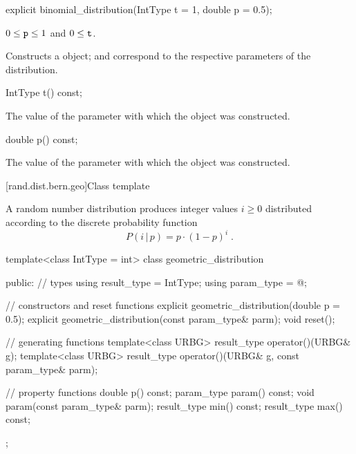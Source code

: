 %
\begin{itemdecl}
explicit binomial_distribution(IntType t = 1, double p = 0.5);
\end{itemdecl}

\begin{itemdescr}
\pnum\requires
 $0 \leq \texttt{\protect p} \leq 1$ and $0 \leq \texttt{\protect t} $.

\pnum\effects Constructs a  object;
  and 
 correspond to the respective parameters of the distribution.
\end{itemdescr}

%
\begin{itemdecl}
IntType t() const;
\end{itemdecl}%
\begin{itemdescr}
\pnum\returns The value of the  parameter
 with which the object was constructed.
\end{itemdescr}

%
\begin{itemdecl}
double p() const;
\end{itemdecl}

\begin{itemdescr}
\pnum\returns The value of the  parameter
 with which the object was constructed.
\end{itemdescr}


[rand.dist.bern.geo]{Class template }
%
%

\pnum
A  random number distribution
produces integer values $i \geq 0$
distributed according to
the discrete probability function
%
%
\[%
 P(i\,|\,p)
      = p \cdot (1-p)^{i}
\; \mbox{.}
\]

%
\begin{codeblock}
template<class IntType = int>
  class geometric_distribution {
  public:
    // types
    using result_type = IntType;
    using param_type  = @\unspec@;

    // constructors and reset functions
    explicit geometric_distribution(double p = 0.5);
    explicit geometric_distribution(const param_type& parm);
    void reset();

    // generating functions
    template<class URBG>
      result_type operator()(URBG& g);
    template<class URBG>
      result_type operator()(URBG& g, const param_type& parm);

    // property functions
    double p() const;
    param_type param() const;
    void param(const param_type& parm);
    result_type min() const;
    result_type max() const;
  };
\end{codeblock}


